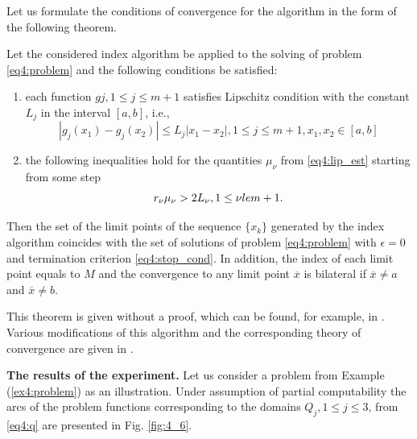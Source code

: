 Let us formulate the conditions of convergence for the algorithm in the form of the following theorem.
\begin{theorem}
Let the considered index algorithm be applied to the solving of problem \eqref{eq4:problem} and the following conditions be satisfied:
\begin{enumerate}
  \item each function $gj, 1\le j\le m+1$ satisfies Lipschitz condition with the constant $L_j$ in the interval $[a,b]$, i.e.,
  \[
  |g_j(x_1)-g_j(x_2)|\le L_j|x_1-x_2|,1\le j\le m+1,x_1,x_2 \in[a,b]
  \]
  \item the following inequalities hold for the quantities $\mu_\nu$ from \eqref{eq4:lip_est} starting from some step
  \[
  r_\nu\mu_\nu > 2L_\nu,1\le\nu\\le m+1.
  \]
\end{enumerate}

Then the set of the limit points of the sequence $\{x_k\}$ generated by the index algorithm coincides with the set of solutions of problem \eqref{eq4:problem} with $\epsilon=0$ and termination criterion \eqref{eq4:stop_cond}. In addition, the index of each limit point equals to $M$ and the convergence to any limit point $\overline{x}$  is bilateral if $\overline{x}\not=a$ and $\overline{x}\not=b$.
\end{theorem}

This theorem is given without a proof, which can be found, for example, in \cite{stronginMarkin1986, stronginMarkin1987}. Various modifications of this algorithm and the corresponding theory of convergence are given in \cite{SergeyevFamularoPugliese2001,barkalovStrongin2002,SergeyevFamularoPugliese2003,sergeyev2006,sergeyevKhalafKvasov2007,sergeyevKvasovKhalaf2007}.

\textbf{The results of the experiment.} Let us consider a problem from Example (\ref{ex4:problem}) as an illustration. Under assumption of partial computability the arcs of the problem functions corresponding to the domains $Q_j, 1\le j\le 3$, from \eqref{eq4:q} are presented in Fig. \ref{fig:4_6}.

